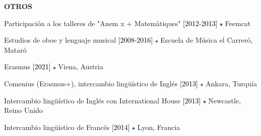 \documentclass[../main.tex]{subfiles}
\begin{document}
    \vspace*{0.8cm}
    \textbf{\textcolor{myCV2}{OTROS\underline{\hspace{16.75cm}}}}
        \vspace*{0.3cm}
        
        Participación a los talleres de "Anem x + Matemàtiques"
        \textcolor{black}{[2012-2013]}
        \includegraphics[width=0.15cm]{assets/full.png} 
        Feemcat

        \vspace*{0.25cm}
        Estudios de oboe y lenguaje musical
        \textcolor{black}{[2008-2016]}
        \includegraphics[width=0.15cm]{assets/full.png} 
        Escuela de Música el Carreró, Mataró

        \vspace*{0.25cm}
        Erasmus
        \textcolor{black}{[2021]}
        \includegraphics[width=0.15cm]{assets/full.png} 
        Viena, Austria
        
        \vspace*{0.25cm}
        Comenius (Erasmus+), intercambio lingüístico de Inglés
        \textcolor{black}{[2013]}
        \includegraphics[width=0.15cm]{assets/full.png} 
        Ankara, Turquía

        \vspace*{0.25cm}
        Intercambio lingüístico de Inglés con International House
        \textcolor{black}{[2013]}
        \includegraphics[width=0.15cm]{assets/full.png} 
        Newcastle, Reino Unido

        \vspace*{0.25cm}
        Intercambio lingüístico de Francés
        \textcolor{black}{[2014]}
        \includegraphics[width=0.15cm]{assets/full.png} 
        Lyon, Francia
        
\end{document}
